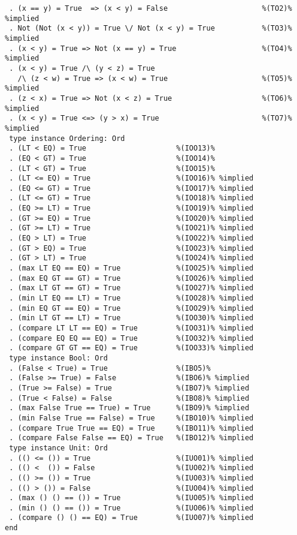 \begin{Verbatim}
 . (x == y) = True  => (x < y) = False                      %(TO2)% %implied
 . Not (Not (x < y)) = True \/ Not (x < y) = True           %(TO3)% %implied
 . (x < y) = True => Not (x == y) = True                    %(TO4)% %implied
 . (x < y) = True /\ (y < z) = True 
   /\ (z < w) = True => (x < w) = True                      %(TO5)% %implied
 . (z < x) = True => Not (x < z) = True                     %(TO6)% %implied
 . (x < y) = True <=> (y > x) = True                        %(TO7)% %implied
 type instance Ordering: Ord
 . (LT < EQ) = True                     %(IOO13)%
 . (EQ < GT) = True                     %(IOO14)%
 . (LT < GT) = True                     %(IOO15)%
 . (LT <= EQ) = True                    %(IOO16)% %implied
 . (EQ <= GT) = True                    %(IOO17)% %implied
 . (LT <= GT) = True                    %(IOO18)% %implied
 . (EQ >= LT) = True                    %(IOO19)% %implied
 . (GT >= EQ) = True                    %(IOO20)% %implied
 . (GT >= LT) = True                    %(IOO21)% %implied
 . (EQ > LT) = True                     %(IOO22)% %implied
 . (GT > EQ) = True                     %(IOO23)% %implied
 . (GT > LT) = True                     %(IOO24)% %implied
 . (max LT EQ == EQ) = True             %(IOO25)% %implied
 . (max EQ GT == GT) = True             %(IOO26)% %implied
 . (max LT GT == GT) = True             %(IOO27)% %implied
 . (min LT EQ == LT) = True             %(IOO28)% %implied
 . (min EQ GT == EQ) = True             %(IOO29)% %implied
 . (min LT GT == LT) = True             %(IOO30)% %implied
 . (compare LT LT == EQ) = True         %(IOO31)% %implied
 . (compare EQ EQ == EQ) = True         %(IOO32)% %implied
 . (compare GT GT == EQ) = True         %(IOO33)% %implied
 type instance Bool: Ord
 . (False < True) = True                %(IBO5)%
 . (False >= True) = False              %(IBO6)% %implied
 . (True >= False) = True               %(IBO7)% %implied
 . (True < False) = False               %(IBO8)% %implied
 . (max False True == True) = True      %(IBO9)% %implied
 . (min False True == False) = True     %(IBO10)% %implied
 . (compare True True == EQ) = True     %(IBO11)% %implied
 . (compare False False == EQ) = True   %(IBO12)% %implied
 type instance Unit: Ord
 . (() <= ()) = True                    %(IUO01)% %implied
 . (() <  ()) = False                   %(IUO02)% %implied
 . (() >= ()) = True                    %(IUO03)% %implied
 . (() > ()) = False                    %(IUO04)% %implied
 . (max () () == ()) = True             %(IUO05)% %implied
 . (min () () == ()) = True             %(IUO06)% %implied
 . (compare () () == EQ) = True         %(IUO07)% %implied
end
\end{Verbatim}

